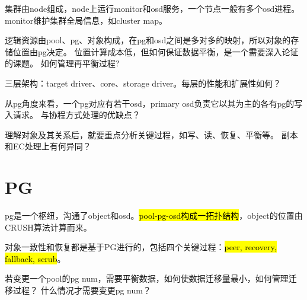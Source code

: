 集群由node组成，node上运行monitor和osd服务，一个节点一般有多个osd进程。
monitor维护集群全局信息，如cluster map。

逻辑资源由pool、pg、对象构成，在pg和osd之间是多对多的映射，所以对象的存储位置由pg决定。
位置计算成本低，但如何保证数据平衡，是一个需要深入论证的课题。
如何管理再平衡过程?

三层架构：target driver、core、storage driver。每层的性能和扩展性如何？

从pg角度来看，一个pg对应有若干osd，primary osd负责它以其为主的各有pg的写入请求。
与协程方式处理的优缺点？

理解对象及其关系后，就要重点分析关键过程，如写、读、恢复、平衡等。
副本和EC处理上有何异同？

\section{PG}

pg是一个枢纽，沟通了object和osd。\hl{pool-pg-osd构成一拓扑结构}，object的位置由CRUSH算法计算而来。

对象一致性和恢复都是基于PG进行的，包括四个关键过程：\hl{peer, recovery, fallback, scrub}。

若变更一个pool的pg num，需要平衡数据，如何使数据迁移量最小，如何管理迁移过程？
什么情况才需要变更pg num？
